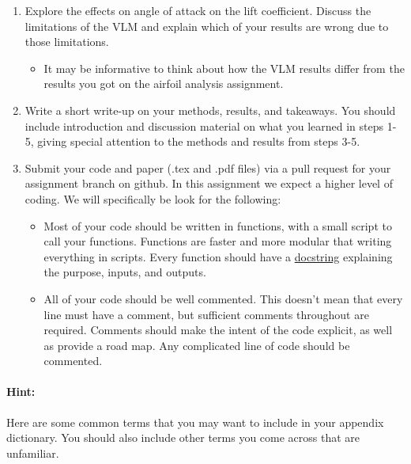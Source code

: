 \documentclass[12pt]{article}
\begin{document}
\begin{enumerate}
	\item Explore the effects on angle of attack on the lift coefficient. Discuss the limitations of the VLM and explain which of your results are wrong due to those limitations.
	\begin{itemize}
		\item It may be informative to think about how the VLM results differ from the results you got on the airfoil analysis assignment.
	\end{itemize}
	\item Write a short write-up on your methods, results, and takeaways. You should include introduction and discussion material on what you learned in steps 1-5, giving special attention to the methods and results from steps 3-5. 
		\item Submit your code and paper (.tex and .pdf files) via a pull request for your assignment branch on github. In this assignment we expect a higher level of coding. We will specifically be look for the following: 
	\begin{itemize}
		\item Most of your code should be written in functions, with a small script to call your functions. Functions are faster and more modular that writing everything in scripts.  Every function should have a \href{https://docs.julialang.org/en/v1/manual/documentation/#Writing-Documentation}{docstring} explaining the purpose, inputs, and outputs. 
		\item All of your code should be well commented. This doesn't mean that every line must have a comment, but sufficient comments throughout are required. Comments should make the intent of the code explicit, as well as provide a road map. Any complicated line of code should be commented. 
	\end{itemize}
\end{enumerate}

\bigskip

\paragraph{Hint:} Here are some common terms that you may want to include in your appendix dictionary. You should also include other terms you come across that are unfamiliar.
\end{document}
